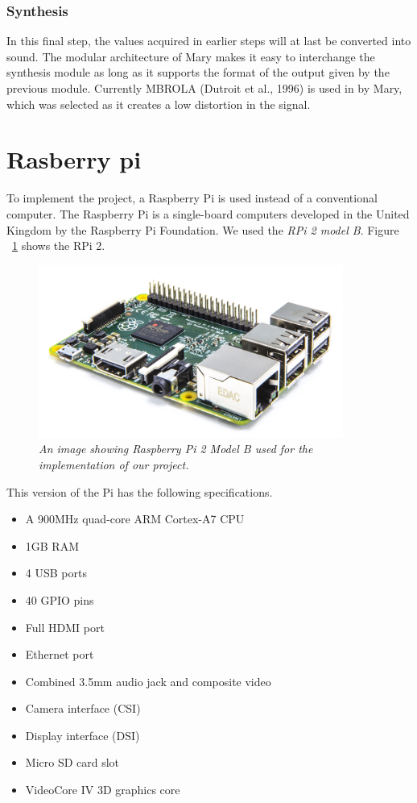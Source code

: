 \documentclass[a4paper, 12pt]{article}
\begin{document}
\subsubsection*{Synthesis}
In this final step, the values acquired in earlier steps will at last be converted into sound.
The modular architecture of Mary makes it easy to interchange the synthesis module as long as it supports the format of the output given by the previous module.
Currently MBROLA (Dutroit et al., 1996) is used in by Mary, which was selected as it creates a low distortion in the signal.

\newpage
\section{Rasberry pi} 
To implement the project, a Raspberry Pi is used instead of a conventional computer. The Raspberry Pi is a single-board computers 
developed in the United Kingdom by the Raspberry Pi Foundation. We used the \textit{RPi 2 model B}. 
Figure ~\ref{fig:Pi2} shows the RPi 2. 
\begin{figure}[ht]
\centering
\includegraphics[width=10.0cm]{Pi2.jpg}
\caption{\textit{An image showing Raspberry Pi 2 Model B used for the implementation of our project.}}
\label{fig:Pi2}
\end{figure}
This version of the Pi has the following specifications.
\begin{itemize}
  \item A 900MHz quad-core ARM Cortex-A7 CPU
  \item 1GB RAM
  \item 4 USB ports
  \item 40 GPIO pins
  \item Full HDMI port
  \item Ethernet port
  \item Combined 3.5mm audio jack and composite video
  \item Camera interface (CSI)
  \item Display interface (DSI)
  \item Micro SD card slot
  \item VideoCore IV 3D graphics core
\end{itemize}
\end{document}

